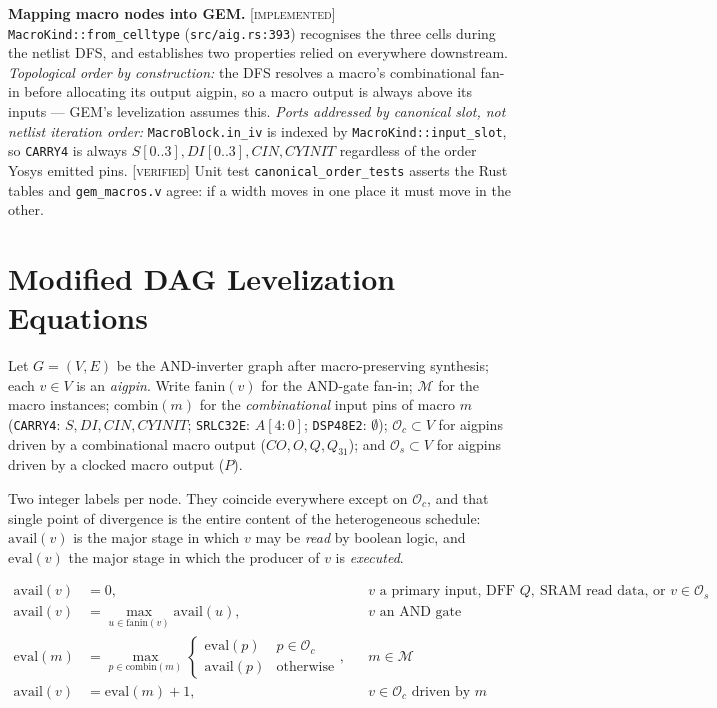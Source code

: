 \documentclass[11pt]{article}
\newcommand{\V}{\textcolor{green!35!black}{\scriptsize\textsc{[verified]}}}
\newcommand{\I}{\textcolor{note}{\scriptsize\textsc{[implemented]}}}
\newcommand{\code}[1]{\texttt{\small #1}}
\begin{document}
\textbf{Mapping macro nodes into GEM.} \I{} \code{MacroKind::from\_celltype}
(\code{src/aig.rs:393}) recognises the three cells during the netlist DFS, and
establishes two properties relied on everywhere downstream. \emph{Topological order
by construction:} the DFS resolves a macro's combinational fan-in before allocating
its output aigpin, so a macro output is always above its inputs --- GEM's levelization
assumes this. \emph{Ports addressed by canonical slot, not netlist iteration order:}
\code{MacroBlock.in\_iv} is indexed by \code{MacroKind::input\_slot}, so \code{CARRY4}
is always $S[0..3], DI[0..3], CIN, CYINIT$ regardless of the order Yosys emitted pins.
\V{} Unit test \code{canonical\_order\_tests} asserts the Rust tables and
\code{gem\_macros.v} agree: if a width moves in one place it must move in the other.

\section{Modified DAG Levelization Equations}\label{sec:sched}

Let $G=(V,E)$ be the AND-inverter graph after macro-preserving synthesis; each
$v \in V$ is an \emph{aigpin}. Write $\mathrm{fanin}(v)$ for the AND-gate fan-in;
$\mathcal{M}$ for the macro instances; $\mathrm{combin}(m)$ for the
\emph{combinational} input pins of macro $m$ (\code{CARRY4}: $S,DI,CIN,CYINIT$;
\code{SRLC32E}: $A[4{:}0]$; \code{DSP48E2}: $\emptyset$); $\mathcal{O}_c \subset V$
for aigpins driven by a combinational macro output ($CO,O,Q,Q_{31}$); and
$\mathcal{O}_s \subset V$ for aigpins driven by a clocked macro output ($P$).

Two integer labels per node. They coincide everywhere except on $\mathcal{O}_c$, and
that single point of divergence is the entire content of the heterogeneous schedule:
$\mathrm{avail}(v)$ is the major stage in which $v$ may be \emph{read} by boolean
logic, and $\mathrm{eval}(v)$ the major stage in which the producer of $v$ is
\emph{executed}.

\vspace{-2pt}
\begin{align}
\mathrm{avail}(v) &= 0, && v \text{ a primary input, DFF } Q,\ \text{SRAM read data, or } v \in \mathcal{O}_s\\
\mathrm{avail}(v) &= \max_{u \in \mathrm{fanin}(v)} \mathrm{avail}(u), && v \text{ an AND gate}\\
\mathrm{eval}(m) &= \max_{p \in \mathrm{combin}(m)}
   \begin{cases} \mathrm{eval}(p) & p \in \mathcal{O}_c\\ \mathrm{avail}(p) & \text{otherwise}\end{cases}, && m \in \mathcal{M}\\
\mathrm{avail}(v) &= \mathrm{eval}(m) + 1, && v \in \mathcal{O}_c \text{ driven by } m
\end{align}
\end{document}
